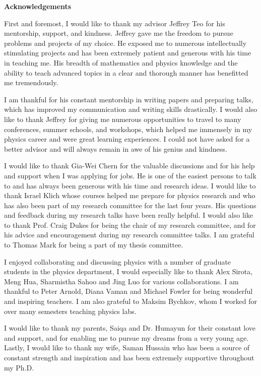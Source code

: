 \begin{center}\textbf{Acknowledgements}
\end{center}

First and foremost, I would like to thank my advisor Jeffrey Teo for his mentorship, support, and kindness. Jeffrey gave me the freedom to pursue problems and projects of my choice. He exposed me to numerous intellectually stimulating projects and has been extremely patient and generous with his time in teaching me. His breadth of mathematics and physics knowledge and the ability to teach advanced topics in a clear and thorough manner has benefitted me tremendously. 

I am thankful for his constant mentorship in writing papers and preparing talks, which has improved my communication and writing skills drastically. I would also like to thank Jeffrey for giving me numerous opportunities to travel to many conferences, summer schools, and workshops, which helped me immensely in my physics career and were great learning experiences. I could not have asked for a better advisor and will always remain in awe of his genius and kindness. 

I would like to thank Gia-Wei Chern for the valuable discussions and for his help and support when I was applying for jobs. He is one of the easiest persons to talk to and has always been generous with his time and research ideas. I would like to thank Israel Klich whose courses helped me prepare for physics research and who has also been part of my research committee for the last four years. His questions and feedback during my research talks have been really helpful. I would also like to thank Prof. Craig Dukes for being the chair of my research committee, and for his advice and encouragement during my research committee talks. I am grateful to Thomas Mark for being a part of my thesis committee.

I enjoyed collaborating and discussing physics with a number of graduate students in the physics department, I would especially like to thank Alex Sirota, Meng Hua, Sharmistha Sahoo and Jing Luo for various collaborations. I am thankful to Peter Arnold, Diana Vaman and Michael Fowler for being wonderful and inspiring teachers. I am also grateful to Maksim Bychkov, whom I worked for over many semesters teaching physics labs. 

I would like to thank my parents, Saiqa and Dr. Humayun for their constant love and support, and for enabling me to pursue my dreams from a very young age. Lastly, I would like to thank my wife, Saman Hussain who has been a source of constant strength and inspiration and has been extremely supportive throughout my Ph.D.


	
